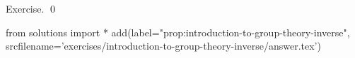 
\begin{prop} 
  \label{prop:introduction-to-group-theory-inverse}
  
\end{prop} 
\proof
Exercise.
  \qed
\begin{python0}
from solutions import *
add(label="prop:introduction-to-group-theory-inverse",
    srcfilename='exercises/introduction-to-group-theory-inverse/answer.tex') 
\end{python0}
